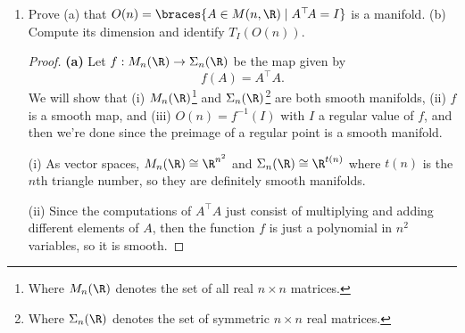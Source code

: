 \documentclass[12pt,letterpaper]{article}
\renewcommand{\H}{\mathbb{H}}
\begin{document}
\begin{enumerate}
\begin{proof}
Next, since $f$ is a local diffeomorphism at each $x\in \preimage{f}{y}$, 
\vspace*{-0.5\baselineskip}
\vspace*{-\baselineskip}
there exist $U'_i \ni x_i$ such that $f$ is a diffeomorphism on $U'_i$. Since every manifold is Hausdorff\footnote{Since it is locally diffeomorphic to $\R^n$ or $\H^n$}, then we can separate the finite set of points $\braces{x_i}$ by disjoint open sets $U''_i$, and $\braces{U'_i\cap U''_i}_{i=1}^n$ are disjoint open sets where $f$ is a diffeomorphism onto its image, but they may not all have the same image. So let 
$$V=\bigcap_{i=1}^n f\left(U'_i\cap U''_i\right)$$
and then $\preimage{f}{V}=\coprod_{i=1}^n U_i$ is a disjoint collection of open neighborhoods, one for each $x_i$, where each $U_i$ is diffeomorphic to $V$, as desired. 
\end{proof}

\pagebreak
\item Prove (a) that $O(n)=\braces{A\in M(n,\R) \mid A^\top\!A = I}$ is a manifold. (b) Compute its dimension and identify $T_I(O(n))$. 

	\begin{proof}\textbf{(a)} Let $f:M_n(\R)\to \Sigma_n(\R)$ be the map given by 
$$f(A)=A^\top A.$$
	We will show that (i) $M_n(\R)$\footnote{Where $M_n(\R)$ denotes the set of all real $n\times n$ matrices.} and $\Sigma_n(\R)$\footnote{Where $\Sigma_n(\R)$ denotes the set of symmetric $n\times n$ real matrices.} are both smooth manifolds, (ii) $f$ is a smooth map, and (iii) $O(n)=f^{-1}(I)$ with $I$ a regular value of $f$, and then we're done since the preimage of a regular point is a smooth manifold.

(i) As vector spaces, $M_n(\R)\cong \R^{n^2}$ and $\Sigma_n(\R)\cong\R^{t(n)}$ where $t(n)$ is the $n$th triangle number, so they are definitely smooth manifolds. 

(ii) Since the computations of $A^\top A$ just consist of multiplying and adding different elements of $A$, then the function $f$ is just a polynomial in $n^2$ variables, so it is smooth. 


\end{proof}
\end{enumerate}
\end{document}
